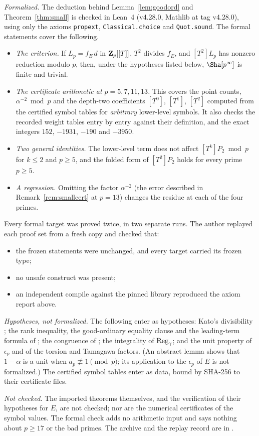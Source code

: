 \begin{remark}\label{rem:a4lean}
\emph{Formalized.} The deduction behind Lemma~\ref{lem:goodord} and Theorem~\ref{thm:small} is checked in Lean~4 (v4.28.0, Mathlib at tag v4.28.0), using only the axioms \texttt{propext}, \texttt{Classical.choice} and \texttt{Quot.sound}. The formal statements cover the following.
\begin{itemize}[leftmargin=*]
\item \emph{The criterion.} If $L_p=f_E\,d$ in $\mathbf{Z}_p[[T]]$, $T^2$ divides $f_E$, and $[T^2]L_p$ has nonzero reduction modulo $p$, then, under the hypotheses listed below, $\Sha[p^\infty]$ is finite and trivial.
\item \emph{The certificate arithmetic at $p=5,7,11,13$.} This covers the point counts, $\alpha^{-2}\bmod p$ and the depth-two coefficients $[T^0]$, $[T^1]$, $[T^2]$ computed from the certified symbol tables for \emph{arbitrary} lower-level symbols. It also checks the recorded weight tables entry by entry against their definition, and the exact integers $152$, $-1931$, $-190$ and $-3950$.
\item \emph{Two general identities.} The lower-level term does not affect $[T^k]P_2\bmod p$ for $k\le2$ and $p\ge5$, and the folded form of $[T^2]P_2$ holds for every prime $p\ge5$.
\item \emph{A regression.} Omitting the factor $\alpha^{-2}$ (the error described in Remark~\ref{rem:smallcert} at $p=13$) changes the residue at each of the four primes.
\end{itemize}
Every formal target was proved twice, in two separate runs. The author replayed each proof set from a fresh copy and checked that:
\begin{itemize}[leftmargin=*]
\item the frozen statements were unchanged, and every target carried its frozen type;
\item no unsafe construct was present;
\item an independent compile against the pinned library reproduced the axiom report above.
\end{itemize}

\emph{Hypotheses, not formalized.} The following enter as hypotheses: Kato's divisibility \cite[Thm.~7.3]{sw}; the rank inequality, the good-ordinary equality clause and the leading-term formula of \cite[Thm.~6.1]{sw}; the congruence of \cite[Prop.~3.5]{sw}; the integrality of $\operatorname{Reg}_\gamma$; and the unit property of $\epsilon_p$ and of the torsion and Tamagawa factors. (An abstract lemma shows that $1-\alpha$ is a unit when $a_p\not\equiv1\pmod p$; its application to the $\epsilon_p$ of $E$ is not formalized.) The certified symbol tables enter as data, bound by SHA-256 to their certificate files.

\emph{Not checked.} The imported theorems themselves, and the verification of their hypotheses for $E$, are not checked; nor are the numerical certificates of the symbol values. The formal check adds no arithmetic input and says nothing about $p\ge17$ or the bad primes. The archive and the replay record are in .
\end{remark}

